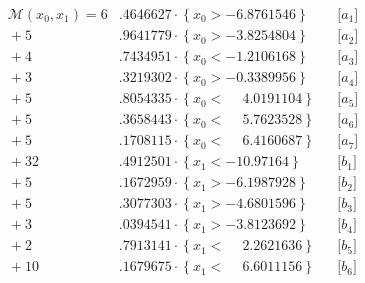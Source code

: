 \documentclass[parskip=half,a4paper]{scrartcl}
\begin{document}
\begin{align*}
    \mathcal{M}(x_0,x_1) =  6&.4646627 \cdot \left\{x_0 > -6.8761546\right\}&& \text{[$a_1$]} \\
  {} + 5&.9641779 \cdot \left\{x_0 > -3.8254804\right\} && \text{[$a_2$]} \\
  {} + 4&.7434951 \cdot \left\{x_0 < -1.2106168\right\} && \text{[$a_3$]} \\
  {} + 3&.3219302 \cdot \left\{x_0 > -0.3389956\right\} && \text{[$a_4$]} \\
  {} + 5&.8054335 \cdot \left\{x_0 < \phantom{-}4.0191104\right\} && \text{[$a_5$]} \\
  {} + 5&.3658443 \cdot \left\{x_0 < \phantom{-}5.7623528\right\} && \text{[$a_6$]} \\
  {} + 5&.1708115 \cdot \left\{x_0 < \phantom{-}6.4160687\right\} && \text{[$a_7$]} \\
  {} + 32&.4912501 \cdot \left\{x_1 < -10.97164\right\} && \text{[$b_1$]} \\
  {} + 5&.1672959 \cdot \left\{x_1 > -6.1987928\right\} && \text{[$b_2$]} \\
  {} + 5&.3077303 \cdot \left\{x_1 > -4.6801596\right\} && \text{[$b_3$]} \\
  {} + 3&.0394541 \cdot \left\{x_1 > -3.8123692\right\} && \text{[$b_4$]} \\
  {} + 2&.7913141 \cdot \left\{x_1 < \phantom{-}2.2621636\right\} && \text{[$b_5$]} \\
  {} + 10&.1679675 \cdot \left\{x_1 < \phantom{-}6.6011156\right\} && \text{[$b_6$]} \\
\end{align*}
\end{document}
